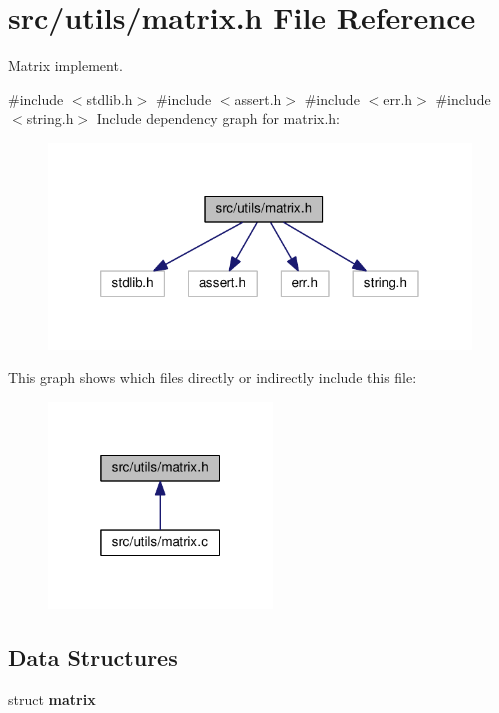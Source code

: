 \section{src/utils/matrix.h File Reference}
\label{matrix_8h}


Matrix implement.  


{\ttfamily \#include $<$stdlib.\+h$>$}\newline
{\ttfamily \#include $<$assert.\+h$>$}\newline
{\ttfamily \#include $<$err.\+h$>$}\newline
{\ttfamily \#include $<$string.\+h$>$}\newline
Include dependency graph for matrix.\+h\+:\nopagebreak
\begin{figure}[H]
\begin{center}
\leavevmode
\includegraphics[width=320pt]{matrix_8h__incl}
\end{center}
\end{figure}
This graph shows which files directly or indirectly include this file\+:
\nopagebreak
\begin{figure}[H]
\begin{center}
\leavevmode
\includegraphics[width=169pt]{matrix_8h__dep__incl}
\end{center}
\end{figure}
\subsection*{Data Structures}
\begin{DoxyCompactItemize}
\item 
struct \textbf{ matrix}
\end{DoxyCompactItemize}
